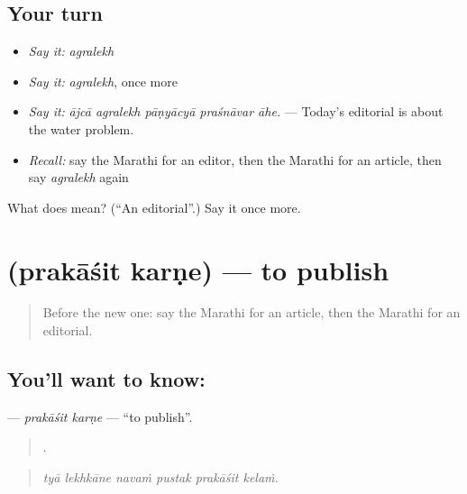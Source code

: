 \subsection*{Your turn}
\begin{itemize}
\raggedright
  \item \emph{Say it:} \emph{agralekh}
  \item \emph{Say it:} \emph{agralekh}, once more
  \item \emph{Say it:} \emph{ājcā agralekh pāṇyācyā praśnāvar āhe.} — Today's editorial is about the water problem.
  \item \emph{Recall:} say the Marathi for an editor, then the Marathi for an article, then say \emph{agralekh} again
\end{itemize}

\begin{tcolorbox}[breakable,colback=teal!4,colframe=teal!35!black,title={Before you move on}]
What does  mean? (\textquotedblleft{}An editorial\textquotedblright{}.) Say it once more.
\end{tcolorbox}
\section[\texorpdfstring{\mr{प्रकाशित} \mr{करणे} (prakāśit karṇe)}{प्रकाशित करणे (prakāśit karṇe)}]{  (prakāśit karṇe) — to publish}

\label{lesson:MR-C311-prakasit-karne}



\begin{quote}
Before the new one: say the Marathi for an article, then the Marathi for an editorial.
\end{quote}

\subsection*{You'll want to know:  }
\textbf{ } — \emph{prakāśit karṇe} — \textquotedblleft{}to publish\textquotedblright{}.

\begin{quote}
     .
\end{quote}

\begin{quote}
\emph{tyā lekhkāne navaṁ pustak prakāśit kelaṁ.}
\end{quote}


